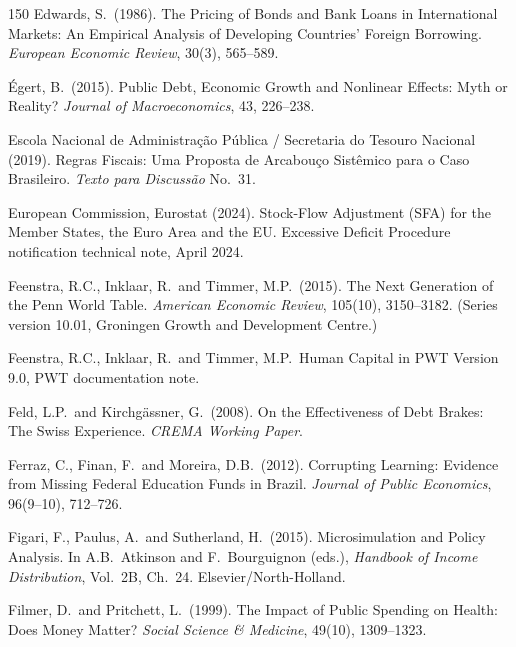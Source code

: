 \documentclass[11pt,a4paper]{article}
\begin{document}
\begin{thebibliography}{150}
 Edwards, S.\ (1986). The Pricing of Bonds and Bank Loans in International Markets: An Empirical Analysis of Developing Countries' Foreign Borrowing. \textit{European Economic Review}, 30(3), 565--589.

 \'Egert, B.\ (2015). Public Debt, Economic Growth and Nonlinear Effects: Myth or Reality? \textit{Journal of Macroeconomics}, 43, 226--238.

 Escola Nacional de Administra\c{c}\~ao P\'ublica / Secretaria do Tesouro Nacional (2019). Regras Fiscais: Uma Proposta de Arcabou\c{c}o Sist\^emico para o Caso Brasileiro. \textit{Texto para Discuss\~ao} No.\ 31.

 European Commission, Eurostat (2024). Stock-Flow Adjustment (SFA) for the Member States, the Euro Area and the EU. Excessive Deficit Procedure notification technical note, April 2024.

 Feenstra, R.C., Inklaar, R.\ and Timmer, M.P.\ (2015). The Next Generation of the Penn World Table. \textit{American Economic Review}, 105(10), 3150--3182. (Series version 10.01, Groningen Growth and Development Centre.)

 Feenstra, R.C., Inklaar, R.\ and Timmer, M.P.\ Human Capital in PWT Version 9.0, PWT documentation note.

 Feld, L.P.\ and Kirchg\"assner, G.\ (2008). On the Effectiveness of Debt Brakes: The Swiss Experience. \textit{CREMA Working Paper}.

 Ferraz, C., Finan, F.\ and Moreira, D.B.\ (2012). Corrupting Learning: Evidence from Missing Federal Education Funds in Brazil. \textit{Journal of Public Economics}, 96(9--10), 712--726.

 Figari, F., Paulus, A.\ and Sutherland, H.\ (2015). Microsimulation and Policy Analysis. In A.B.\ Atkinson and F.\ Bourguignon (eds.), \textit{Handbook of Income Distribution}, Vol.\ 2B, Ch.\ 24. Elsevier/North-Holland.

 Filmer, D.\ and Pritchett, L.\ (1999). The Impact of Public Spending on Health: Does Money Matter? \textit{Social Science \& Medicine}, 49(10), 1309--1323.


\end{thebibliography}
\end{document}
